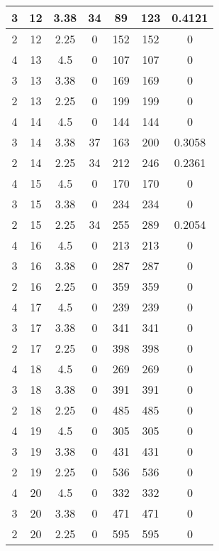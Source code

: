 \documentclass[letterpaper, 12pt]{article}
\begin{document}
\begin{longtable}{|c|c|c|c|c|c|c|}
\hline
3 & 12 & 3.38 & 34 & 89 & 123 & 0.4121 \\
\hline
2 & 12 & 2.25 & 0 & 152 & 152 & 0 \\
\hline
4 & 13 & 4.5 & 0 & 107 & 107 & 0 \\
\hline
3 & 13 & 3.38 & 0 & 169 & 169 & 0 \\
\hline
2 & 13 & 2.25 & 0 & 199 & 199 & 0 \\
\hline
4 & 14 & 4.5 & 0 & 144 & 144 & 0 \\
\hline
3 & 14 & 3.38 & 37 & 163 & 200 & 0.3058 \\
\hline
2 & 14 & 2.25 & 34 & 212 & 246 & 0.2361 \\
\hline
4 & 15 & 4.5 & 0 & 170 & 170 & 0 \\
\hline
3 & 15 & 3.38 & 0 & 234 & 234 & 0 \\
\hline
2 & 15 & 2.25 & 34 & 255 & 289 & 0.2054 \\
\hline
4 & 16 & 4.5 & 0 & 213 & 213 & 0 \\
\hline
3 & 16 & 3.38 & 0 & 287 & 287 & 0 \\
\hline
2 & 16 & 2.25 & 0 & 359 & 359 & 0 \\
\hline
4 & 17 & 4.5 & 0 & 239 & 239 & 0 \\
\hline
3 & 17 & 3.38 & 0 & 341 & 341 & 0 \\
\hline
2 & 17 & 2.25 & 0 & 398 & 398 & 0 \\
\hline
4 & 18 & 4.5 & 0 & 269 & 269 & 0 \\
\hline
3 & 18 & 3.38 & 0 & 391 & 391 & 0 \\
\hline
2 & 18 & 2.25 & 0 & 485 & 485 & 0 \\
\hline
4 & 19 & 4.5 & 0 & 305 & 305 & 0 \\
\hline
3 & 19 & 3.38 & 0 & 431 & 431 & 0 \\
\hline
2 & 19 & 2.25 & 0 & 536 & 536 & 0 \\
\hline
4 & 20 & 4.5 & 0 & 332 & 332 & 0 \\
\hline
3 & 20 & 3.38 & 0 & 471 & 471 & 0 \\
\hline
2 & 20 & 2.25 & 0 & 595 & 595 & 0 \\
\hline
\end{longtable}
\end{document}
